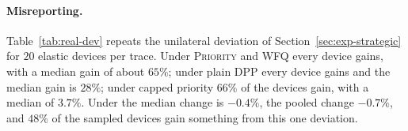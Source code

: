 \begin{table}[t]
\centering
\caption{Trace-driven scenario: effect of $V$ (mean over six traces). The class envy reported is the largest over tiers and RT classes; the bound shown is that of the free tier and the video class, and the bounds of the premium tier and of the gaming class are larger.}
\label{tab:real-sweep}
\resizebox{0.9\linewidth}{!}{}
\end{table}

\begin{table}[t]
\centering
\caption{Trace-driven scenario: unilateral misreport under \repay{} and under the variant without the debt price, for several $V$ ($120$ devices on six traces). The bound is $B_{g,\mathrm{v}}$ at that $V$ for the tier of the device.}
\label{tab:real-sweep-dev}
\resizebox{0.9\linewidth}{!}{}
\end{table}

\paragraph{Misreporting.}
Table~\ref{tab:real-dev} repeats the unilateral deviation of Section~\ref{sec:exp-strategic} for $20$ elastic devices per trace.
Under \textsc{Priority} and \textsc{WFQ} every device gains, with a median gain of about $65\%$; under plain DPP every device gains and the median gain is $28\%$; under capped priority $66\%$ of the devices gain, with a median of $3.7\%$.
Under \repay{} the median change is $-0.4\%$, the pooled change $-0.7\%$, and $48\%$ of the sampled devices gain something from this one deviation.

